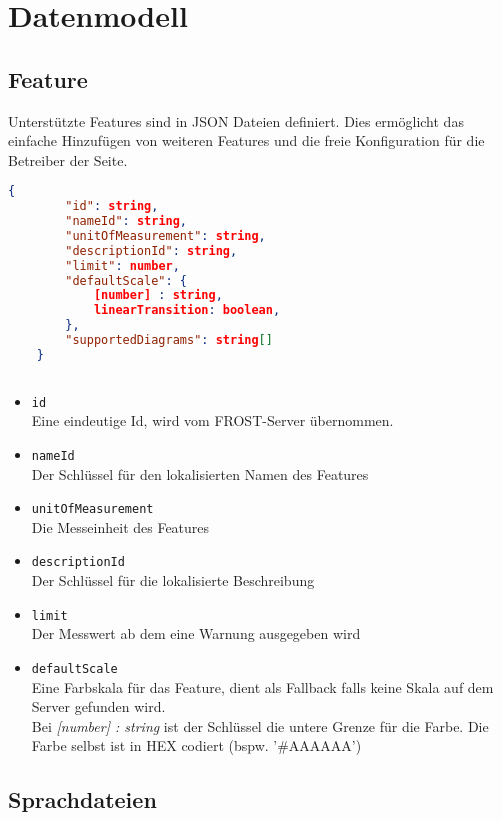 \section{Datenmodell}
\subsection{Feature}

Unterstützte Features sind in JSON Dateien definiert.
Dies ermöglicht das einfache Hinzufügen von weiteren Features und die freie Konfiguration für die Betreiber der Seite.


\begin{lstlisting}[language=json,firstnumber=1]
    {
	    "id": string,
	    "nameId": string,
	    "unitOfMeasurement": string,
	    "descriptionId": string,
	    "limit": number,
	    "defaultScale": {
			[number] : string,
			linearTransition: boolean,
	    },
	    "supportedDiagrams": string[]
    }
    
\end{lstlisting}

\begin{itemize}
	\item \texttt{id} 
	\\ Eine eindeutige Id, wird vom FROST-Server übernommen.
	\item \texttt{nameId} 
	\\ Der Schlüssel für den lokalisierten Namen des Features
	\item \texttt{unitOfMeasurement} 
	\\ Die Messeinheit des Features
	\item \texttt{descriptionId} 
	\\ Der Schlüssel für die lokalisierte Beschreibung
	\item \texttt{limit} 
	\\ Der Messwert ab dem eine Warnung ausgegeben wird
	\item \texttt{defaultScale} 
	\\ Eine Farbskala für das Feature, dient als Fallback falls keine Skala auf dem Server gefunden wird.
	\\ Bei \emph{[number] : string} ist der Schlüssel die untere Grenze für die Farbe.
	Die Farbe selbst ist in HEX codiert (bspw. '\#AAAAAA') 
\end{itemize}
\newpage
\subsection{Sprachdateien}


